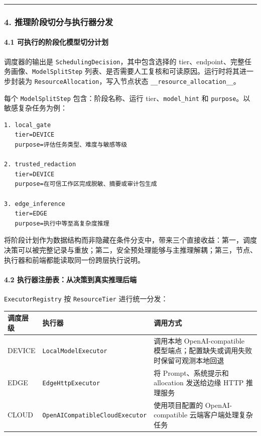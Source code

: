 \documentclass[UTF8,a4paper,12pt]{ctexart}
\begin{document}
\begin{center}\rule{0.5\linewidth}{0.5pt}\end{center}

\subsubsection{4. 推理阶段切分与执行器分发}

\paragraph{4.1 可执行的阶段化模型切分计划}

调度器的输出是 \texttt{SchedulingDecision}，其中包含选择的 tier、endpoint、完整任务画像、\texttt{ModelSplitStep} 列表、是否需要人工复核和可读原因。运行时将其进一步封装为 \texttt{ResourceAllocation}，写入节点状态 \texttt{\_\_resource\_allocation\_\_}。

每个 \texttt{ModelSplitStep} 包含：阶段名称、运行 tier、\texttt{model\_hint} 和 \texttt{purpose}。以敏感复杂任务为例：

\begin{verbatim}
1. local_gate
   tier=DEVICE
   purpose=评估任务类型、难度与敏感等级

2. trusted_redaction
   tier=DEVICE
   purpose=在可信工作区完成脱敏、摘要或审计包生成

3. edge_inference
   tier=EDGE
   purpose=执行中等至高复杂度推理
\end{verbatim}

将阶段计划作为数据结构而非隐藏在条件分支中，带来三个直接收益：第一，调度决策可以被完整记录与重放；第二，安全预处理能够与主推理解耦；第三，节点、执行器和前端都能读取同一份跨层执行说明。

\paragraph{4.2 执行器注册表：从决策到真实推理后端}

\texttt{ExecutorRegistry} 按 \texttt{ResourceTier} 进行统一分发：

\begin{longtable}[]{@{}lll@{}}
\toprule
调度层级 & 执行器 & 调用方式 \\
\midrule
\endhead
DEVICE & \texttt{LocalModelExecutor} & 调用本地 OpenAI-compatible 模型端点；配置缺失或调用失败时保留可观测本地回退 \\
EDGE & \texttt{EdgeHttpExecutor} & 将 Prompt、系统提示和 allocation 发送给边缘 HTTP 推理服务 \\
CLOUD & \texttt{OpenAICompatibleCloudExecutor} & 使用项目配置的 OpenAI-compatible 云端客户端处理复杂任务 \\
\bottomrule
\end{longtable}
\end{document}
